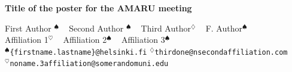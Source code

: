 \documentclass[portrait]{Hylangtechposter}
\begin{document}
\printheader

\begin{center}
\textbf{\bf\veryHuge\color{NavyBlue}Title of the poster for the AMARU meeting \\[1.5cm]}


\huge     First Author $^{\spadesuit}$ ~
    Second Author $^{\spadesuit}$ ~ 
    Third Author$^{\diamondsuit}$ ~ 
    F. Author$^{\spadesuit}$ \\[0.2cm] 
\Large Affiliation 1$^{\heartsuit}$ ~ 
    Affiliation 2$^{\spadesuit}$ ~
    Affiliation 3$^{\spadesuit}$ \\[0.2cm]
\Large    $^{\spadesuit}$\texttt{\{firstname.lastname\}@helsinki.fi} \qquad $^{\diamondsuit}$\texttt{thirdone@nsecondaffiliation.com} \\
\Large   $^{\heartsuit}$\texttt{noname.3affiliation@somerandomuni.edu} 
 \end{center}

\vspace{2cm}

 \color{Navy}

  



 \Large
\end{document}
